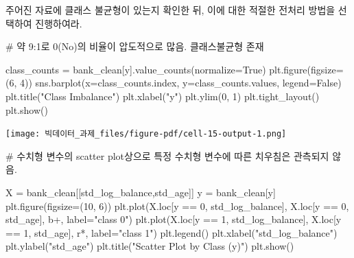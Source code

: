 \documentclass[
  a4paper,
  DIV=11,
  numbers=noendperiod]{scrreprt}
\newenvironment{Shaded}{\begin{snugshade}}{\end{snugshade}}
\newcommand{\CommentTok}[1]{\textcolor[rgb]{0.37,0.37,0.37}{#1}}
\newcommand{\DecValTok}[1]{\textcolor[rgb]{0.68,0.00,0.00}{#1}}
\newcommand{\NormalTok}[1]{\textcolor[rgb]{0.00,0.23,0.31}{#1}}
\newcommand{\OperatorTok}[1]{\textcolor[rgb]{0.37,0.37,0.37}{#1}}
\newcommand{\StringTok}[1]{\textcolor[rgb]{0.13,0.47,0.30}{#1}}
\newcommand{\VariableTok}[1]{\textcolor[rgb]{0.07,0.07,0.07}{#1}}
\begin{document}
주어진 자료에 클래스 불균형이 있는지 확인한 뒤, 이에 대한 적절한 전처리
방법을 선택하여 진행하여라.

\begin{Shaded}
\begin{Highlighting}[]
\CommentTok{\# 약 9:1로 0(No)의 비율이 압도적으로 많음. 클래스불균형 존재}

\NormalTok{class\_counts }\OperatorTok{=}\NormalTok{ bank\_clean[}\StringTok{\textquotesingle{}y\textquotesingle{}}\NormalTok{].value\_counts(normalize}\OperatorTok{=}\VariableTok{True}\NormalTok{)}
\NormalTok{plt.figure(figsize}\OperatorTok{=}\NormalTok{(}\DecValTok{6}\NormalTok{, }\DecValTok{4}\NormalTok{))}
\NormalTok{sns.barplot(x}\OperatorTok{=}\NormalTok{class\_counts.index, y}\OperatorTok{=}\NormalTok{class\_counts.values, legend}\OperatorTok{=}\VariableTok{False}\NormalTok{)}
\NormalTok{plt.title(}\StringTok{"Class Imbalance"}\NormalTok{)}
\NormalTok{plt.xlabel(}\StringTok{"y"}\NormalTok{)}
\NormalTok{plt.ylim(}\DecValTok{0}\NormalTok{, }\DecValTok{1}\NormalTok{)}
\NormalTok{plt.tight\_layout()}
\NormalTok{plt.show()}
\end{Highlighting}
\end{Shaded}

\texttt{[image: 빅데이터\_과제\_files/figure-pdf/cell-15-output-1.png]}

\begin{Shaded}
\begin{Highlighting}[]
\CommentTok{\# 수치형 변수의 scatter plot상으로 특정 수치형 변수에 따른 치우침은 관측되지 않음.}

\NormalTok{X }\OperatorTok{=}\NormalTok{ bank\_clean[[}\StringTok{\textquotesingle{}std\_log\_balance\textquotesingle{}}\NormalTok{,}\StringTok{\textquotesingle{}std\_age\textquotesingle{}}\NormalTok{]]}
\NormalTok{y }\OperatorTok{=}\NormalTok{ bank\_clean[}\StringTok{\textquotesingle{}y\textquotesingle{}}\NormalTok{]}
\NormalTok{plt.figure(figsize}\OperatorTok{=}\NormalTok{(}\DecValTok{10}\NormalTok{, }\DecValTok{6}\NormalTok{))}
\NormalTok{plt.plot(X.loc[y }\OperatorTok{==} \DecValTok{0}\NormalTok{, }\StringTok{\textquotesingle{}std\_log\_balance\textquotesingle{}}\NormalTok{], X.loc[y }\OperatorTok{==} \DecValTok{0}\NormalTok{, }\StringTok{\textquotesingle{}std\_age\textquotesingle{}}\NormalTok{], }\StringTok{\textquotesingle{}b+\textquotesingle{}}\NormalTok{, label}\OperatorTok{=}\StringTok{"class 0"}\NormalTok{)}
\NormalTok{plt.plot(X.loc[y }\OperatorTok{==} \DecValTok{1}\NormalTok{, }\StringTok{\textquotesingle{}std\_log\_balance\textquotesingle{}}\NormalTok{], X.loc[y }\OperatorTok{==} \DecValTok{1}\NormalTok{, }\StringTok{\textquotesingle{}std\_age\textquotesingle{}}\NormalTok{], }\StringTok{\textquotesingle{}r*\textquotesingle{}}\NormalTok{, label}\OperatorTok{=}\StringTok{"class 1"}\NormalTok{)}
\NormalTok{plt.legend()}
\NormalTok{plt.xlabel(}\StringTok{"std\_log\_balance"}\NormalTok{)}
\NormalTok{plt.ylabel(}\StringTok{"std\_age"}\NormalTok{)}
\NormalTok{plt.title(}\StringTok{"Scatter Plot by Class (y)"}\NormalTok{)}
\NormalTok{plt.show()}
\end{Highlighting}
\end{Shaded}
\end{document}
